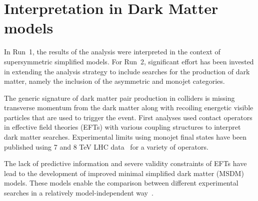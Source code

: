 \section{Interpretation in Dark Matter models} \label{sec:darkmatter}

In Run~1, the results of the \alphat analysis were interpreted in the context of
supersymmetric simplified models. For Run~2, significant effort has been invested
in extending the analysis strategy to include searches for the production of dark
matter, namely the inclusion of the asymmetric and monojet categories.

The generic signature of dark matter pair production in colliders is missing
transverse momentum from the dark matter along with recoiling energetic visible
particles that are used to trigger the event. First analyses used contact 
operators~\cite{Goodman:2010ku} in effective field theories (EFTs) with various 
coupling structures to interpret dark matter searches. Experimental limits using
monojet final states have been published using 7 and 8 TeV LHC 
data~\cite{Chatrchyan:2012me,ATLAS:2012ky} for a variety of operators.


The lack of predictive information and severe validity constraints of EFTs have
lead to the development of improved minimal simplified dark matter (MSDM) models.
These models enable the comparison between different experimental
searches in a relatively model-independent way~\cite{Buchmueller:2014yoa}.



